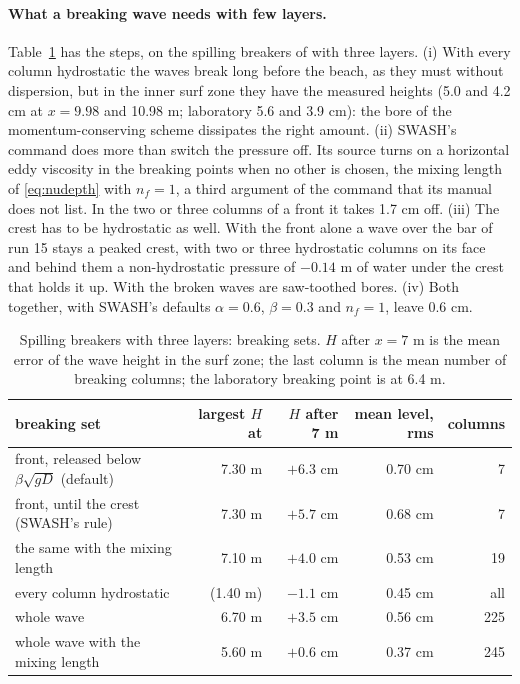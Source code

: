 \paragraph{What a breaking wave needs with few layers.}
Table~\ref{tab:flumes-tk} has the steps, on the spilling breakers of
\citet{ting1994} with three layers. (i) With every column hydrostatic the
waves break long before the beach, as they must without dispersion, but in
the inner surf zone they have the measured heights (5.0 and 4.2 cm at
$x = 9.98$ and 10.98 m; laboratory 5.6 and 3.9 cm): the bore of the
momentum-conserving scheme dissipates the right amount. (ii) SWASH's
 command does more than switch the pressure off. Its source
turns on a horizontal eddy viscosity in the breaking points when no other
is chosen, the mixing length of \eqref{eq:nudepth} with $n_f = 1$, a third
argument of the command that its manual does not list. In the two or three
columns of a front it takes 1.7 cm off. (iii) The crest has to be
hydrostatic as well. With the front alone a wave over the bar of run 15
stays a peaked crest, with two or three hydrostatic columns on its face and
behind them a non-hydrostatic pressure of $-0.14$ m of water under the
crest that holds it up. With  the broken waves are
saw-toothed bores. (iv) Both together, with SWASH's defaults
$\alpha = 0.6$, $\beta = 0.3$ and $n_f = 1$, leave 0.6 cm.

\begin{table}[htbp]
\centering
\caption{Spilling breakers \citep{ting1994} with three layers: breaking
sets. $H$ after $x = 7$ m is the mean error of the wave height in the surf
zone; the last column is the mean number of breaking columns; the laboratory breaking point is at 6.4 m.}
\label{tab:flumes-tk}
\footnotesize
\begin{tabular}{lrrrr}
\toprule
breaking set & largest $H$ at & $H$ after 7 m & mean level, rms & columns \\
\midrule
front, released below $\beta\sqrt{gD}$ (default) & 7.30 m & $+6.3$ cm & 0.70 cm & 7 \\
front, until the crest (SWASH's rule) & 7.30 m & $+5.7$ cm & 0.68 cm & 7 \\
the same with the mixing length & 7.10 m & $+4.0$ cm & 0.53 cm & 19 \\
every column hydrostatic & (1.40 m) & $-1.1$ cm & 0.45 cm & all \\
whole wave & 6.70 m & $+3.5$ cm & 0.56 cm & 225 \\
whole wave with the mixing length & 5.60 m & $+0.6$ cm & 0.37 cm & 245 \\
\bottomrule
\end{tabular}
\end{table}

